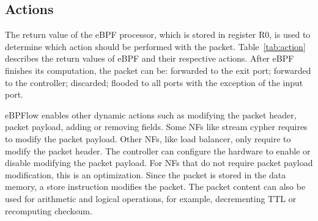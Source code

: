 \subsection{Actions}

\begin{table}[tb]
\centering
\caption{Action performed on the packets.}
\label{tab:action}
\end{table}


The return value of the eBPF processor, which is stored in register R0, is used to determine which action should be performed with the packet. Table~\ref{tab:action} describes the return values of eBPF and their respective actions. After eBPF finishes its computation, the packet can be: forwarded to the exit port; forwarded to the controller; discarded; flooded to all ports with the exception of the input port.


eBPFlow enables other dynamic actions such as modifying the packet header, packet payload, adding or removing fields.
Some NFs like stream cypher requires to modify the packet payload. Other NFs, like load balancer, only require to modify the packet header. The controller can configure the hardware to enable or disable modifying the packet payload. For NFs that do not require packet payload modification, this is an optimization.
Since the packet is stored in the data memory, a store instruction modifies the packet. The packet content can also be used for arithmetic and logical operations, for example, decrementing TTL or recomputing checksum.

